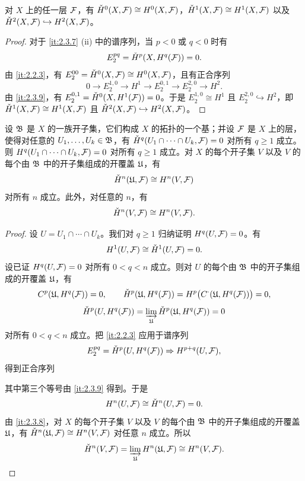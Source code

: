 \begin{corollary}\label{it:2.3.10}
对 $X$ 上的任一层 $\mathcal{F}$，有 $\check{H}^0(X,\mathcal{F})\cong H^0(X,\mathcal{F})$，$\check{H}^1(X,\mathcal{F})\cong H^1(X,\mathcal{F})$ 以及 $\check{H}^2(X,\mathcal{F})\hookrightarrow H^2(X,\mathcal{F})$。
\end{corollary}

\begin{proof}
对于 \ref{it:2.3.7} (ii) 中的谱序列，当 $p<0$ 或 $q<0$ 时有
\[
E_2^{pq}=\check{H}^p(X,H^q(\mathcal{F}))=0.
\]
由 \ref{it:2.2.3}，有 $E_2^{00}=\check{H}^0(X,\mathcal{F})\cong H^0(X,\mathcal{F})$，且有正合序列
\[
0\to E_2^{1,0}\to H^1\to E_2^{0,1}\to E_2^{2,0}\to H^2.
\]
由 \ref{it:2.3.9}，有 $E_2^{0,1}=\check{H}^0(X,H^1(\mathcal{F}))=0$。于是 $E_2^{1,0}\cong H^1$ 且 $E_2^{2,0}\hookrightarrow H^2$，即 $\check{H}^1(X,\mathcal{F})\cong H^1(X,\mathcal{F})$ 且 $\check{H}^2(X,\mathcal{F})\hookrightarrow H^2(X,\mathcal{F})$。
\end{proof}

\begin{proposition}[Cartan 引理]\label{it:2.3.11}
设 $\mathfrak{B}$ 是 $X$ 的一族开子集，它们构成 $X$ 的拓扑的一个基；并设 $\mathcal{F}$ 是 $X$ 上的层，使得对任意的 $U_1,\dots,U_k\in\mathfrak{B}$，有 $\check{H}^q(U_1\cap\cdots\cap U_k,\mathcal{F})=0$ 对所有 $q\ge 1$ 成立。则 $H^q(U_1\cap\cdots\cap U_k,\mathcal{F})=0$ 对所有 $q\ge 1$ 成立。对 $X$ 的每个开子集 $V$ 以及 $V$ 的每个由 $\mathfrak{B}$ 中的开子集组成的开覆盖 $\mathfrak{U}$，有
\[
\check{H}^n(\mathfrak{U},\mathcal{F})\cong H^n(V,\mathcal{F})
\]
对所有 $n$ 成立。此外，对任意的 $n$，有
\[
\check{H}^n(V,\mathcal{F})\cong H^n(V,\mathcal{F}).
\]
\end{proposition}

\begin{proof}
设 $U=U_1\cap\cdots\cap U_k$。我们对 $q\ge 1$ 归纳证明 $H^q(U,\mathcal{F})=0$。有
\[
H^1(U,\mathcal{F})\cong\check{H}^1(U,\mathcal{F})=0.
\]
设已证 $H^q(U,\mathcal{F})=0$ 对所有 $0<q<n$ 成立。则对 $U$ 的每个由 $\mathfrak{B}$ 中的开子集组成的开覆盖 $\mathfrak{U}$，有
\[
C^p(\mathfrak{U},H^q(\mathcal{F}))=0,\qquad
\check{H}^p(\mathfrak{U},H^q(\mathcal{F}))=H^p\bigl(C^\cdot(\mathfrak{U},H^q(\mathcal{F}))\bigr)=0,
\]
\[
\check{H}^p(U,H^q(\mathcal{F}))=\varinjlim_{\mathfrak{U}}\check{H}^p(\mathfrak{U},H^q(\mathcal{F}))=0
\]
对所有 $0<q<n$ 成立。把 \ref{it:2.2.3} 应用于谱序列
\[
E_2^{pq}=\check{H}^p(U,H^q(\mathcal{F}))\Rightarrow H^{p+q}(U,\mathcal{F}),
\]
得到正合序列
\begin{center}
\end{center}
其中第三个等号由 \ref{it:2.3.9} 得到。于是
\[
H^n(U,\mathcal{F})\cong\check{H}^n(U,\mathcal{F})=0.
\]
由 \ref{it:2.3.8}，对 $X$ 的每个开子集 $V$ 以及 $V$ 的每个由 $\mathfrak{B}$ 中的开子集组成的开覆盖 $\mathfrak{U}$，有 $\check{H}^n(\mathfrak{U},\mathcal{F})\cong H^n(V,\mathcal{F})$ 对任意 $n$ 成立。所以
\[
\check{H}^n(V,\mathcal{F})=\varinjlim_{\mathfrak{U}}H^n(\mathfrak{U},\mathcal{F})\cong H^n(V,\mathcal{F}).
\]
\end{proof}

